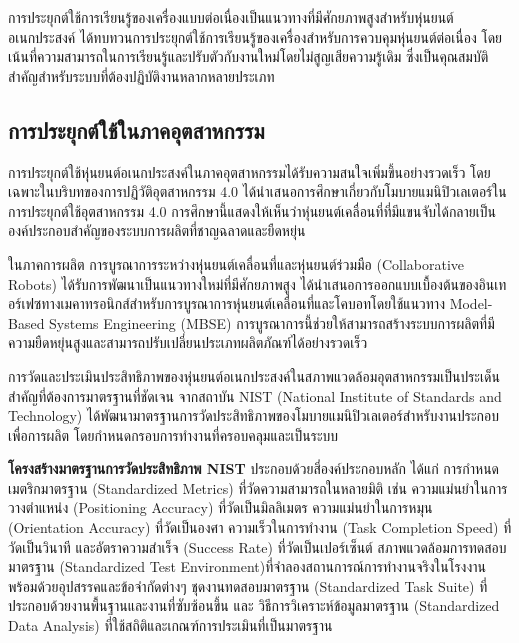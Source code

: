 \documentclass[a4paper]{article}
\begin{document}
การประยุกต์ใช้การเรียนรู้ของเครื่องแบบต่อเนื่องเป็นแนวทางที่มีศักยภาพสูงสำหรับหุ่นยนต์อเนกประสงค์ \textcite{thuruthel2021survey} ได้ทบทวนการประยุกต์ใช้การเรียนรู้ของเครื่องสำหรับการควบคุมหุ่นยนต์ต่อเนื่อง โดยเน้นที่ความสามารถในการเรียนรู้และปรับตัวกับงานใหม่โดยไม่สูญเสียความรู้เดิม ซึ่งเป็นคุณสมบัติสำคัญสำหรับระบบที่ต้องปฏิบัติงานหลากหลายประเภท

\subsection{การประยุกต์ใช้ในภาคอุตสาหกรรม}

การประยุกต์ใช้หุ่นยนต์อเนกประสงค์ในภาคอุตสาหกรรมได้รับความสนใจเพิ่มขึ้นอย่างรวดเร็ว โดยเฉพาะในบริบทของการปฏิวัติอุตสาหกรรม 4.0 \textcite{mohammadi2023mobile} ได้นำเสนอการศึกษาเกี่ยวกับโมบายแมนิปิวเลเตอร์ในการประยุกต์ใช้อุตสาหกรรม 4.0 การศึกษานี้แสดงให้เห็นว่าหุ่นยนต์เคลื่อนที่ที่มีแขนจับได้กลายเป็นองค์ประกอบสำคัญของระบบการผลิตที่ชาญฉลาดและยืดหยุ่น

ในภาคการผลิต การบูรณาการระหว่างหุ่นยนต์เคลื่อนที่และหุ่นยนต์ร่วมมือ (Collaborative Robots) ได้รับการพัฒนาเป็นแนวทางใหม่ที่มีศักยภาพสูง \textcite{vitolo2022mobile} ได้นำเสนอการออกแบบเบื้องต้นของอินเทอร์เฟซทางเมคาทรอนิกส์สำหรับการบูรณาการหุ่นยนต์เคลื่อนที่และโคบอทโดยใช้แนวทาง Model-Based Systems Engineering (MBSE) การบูรณาการนี้ช่วยให้สามารถสร้างระบบการผลิตที่มีความยืดหยุ่นสูงและสามารถปรับเปลี่ยนประเภทผลิตภัณฑ์ได้อย่างรวดเร็ว

การวัดและประเมินประสิทธิภาพของหุ่นยนต์อเนกประสงค์ในสภาพแวดล้อมอุตสาหกรรมเป็นประเด็นสำคัญที่ต้องการมาตรฐานที่ชัดเจน \textcite{bostelman2016mobile} จากสถาบัน NIST (National Institute of Standards and Technology) ได้พัฒนามาตรฐานการวัดประสิทธิภาพของโมบายแมนิปิวเลเตอร์สำหรับงานประกอบเพื่อการผลิต โดยกำหนดกรอบการทำงานที่ครอบคลุมและเป็นระบบ

\textbf{โครงสร้างมาตรฐานการวัดประสิทธิภาพ NIST} ประกอบด้วยสี่องค์ประกอบหลัก ได้แก่ การกำหนดเมตริกมาตรฐาน (Standardized Metrics) ที่วัดความสามารถในหลายมิติ เช่น ความแม่นยำในการวางตำแหน่ง (Positioning Accuracy) ที่วัดเป็นมิลลิเมตร ความแม่นยำในการหมุน (Orientation Accuracy) ที่วัดเป็นองศา ความเร็วในการทำงาน (Task Completion Speed) ที่วัดเป็นวินาที และอัตราความสำเร็จ (Success Rate) ที่วัดเป็นเปอร์เซ็นต์ สภาพแวดล้อมการทดสอบมาตรฐาน (Standardized Test Environment)ที่จำลองสถานการณ์การทำงานจริงในโรงงาน พร้อมด้วยอุปสรรคและข้อจำกัดต่างๆ ชุดงานทดสอบมาตรฐาน (Standardized Task Suite) ที่ประกอบด้วยงานพื้นฐานและงานที่ซับซ้อนขึ้น และ วิธีการวิเคราะห์ข้อมูลมาตรฐาน (Standardized Data Analysis) ที่ใช้สถิติและเกณฑ์การประเมินที่เป็นมาตรฐาน
\end{document}
